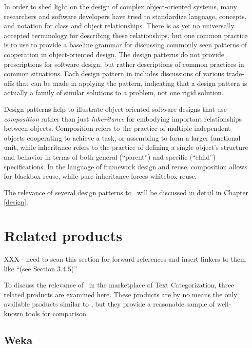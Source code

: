 In order to shed light on the design of complex object-oriented
systems, many researchers and software developers have tried to
standardize language, concepts, and notation for class and object
relationships.  There is as yet no universally accepted terminology
for describing these relationships, but one common practice is to use
 to provide a baseline grammar for
discussing commonly seen patterns of cooperation in object-oriented
design. \cite[p. 3]{gamma:95} The design patterns do not provide
prescriptions for software design, but rather descriptions of common
practices in common situations.  Each design pattern in \cite{gamma:95}
includes discussions of various trade-offs that can be made in applying
the pattern, indicating that a design pattern is actually a family of
similar solutions to a problem, not one rigid solution.

Design patterns help to illustrate object-oriented software designs
that use \emph{composition} rather than just \emph{inheritance} for
embodying important relationships between objects.  Composition refers
to the practice of multiple independent objects cooperating to achieve
a task, or assembling to form a larger functional unit, while
inheritance refers to the practice of defining a single object's
structure and behavior in terms of both general (``parent'') and
specific (``child'') specifications.  In the language of framework
design and reuse, composition allows for blackbox reuse, while pure
inheritance forces whitebox reuse. \cite[p. 19]{gamma:95}

The relevance of several design patterns to \aicat\ will be discussed
in detail in Chapter \ref{design}.

\section{Related products}

XXX - need to scan this section for forward references and insert
linkers to them like ``(see Section 3.4.5)''

To discuss the relevance of \aicat\ in the marketplace of Text
Categorization, three related products are examined here.  These
products are by no means the only available products similar to
\aicat, but they provide a reasonable sample of well-known tools for
comparison.

\subsection{Weka}

